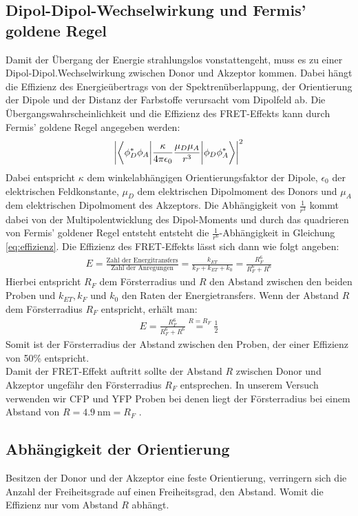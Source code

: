 \subsection*{Dipol-Dipol-Wechselwirkung und Fermis' goldene Regel}
Damit der Übergang der Energie strahlungslos vonstattengeht, muss es zu einer Dipol-Dipol.Wechselwirkung zwischen Donor und Akzeptor kommen. Dabei hängt die Effizienz des Energieübertrags von der Spektrenüberlappung, der Orientierung der Dipole und der Distanz der Farbstoffe verursacht vom Dipolfeld ab. Die Übergangswahrscheinlichkeit und die Effizienz des FRET-Effekts kann durch Fermis' goldene Regel angegeben werden:
\begin{gather}
    \abs{\left\langle \phi_{D}^* \phi_A \bigg \vert \frac{\kappa}{4\pi\epsilon_0} \frac{\mu_D\mu_A}{r^3} \bigg \vert \phi_D \phi_A^* \right\rangle }^2
\end{gather}
Dabei entspricht $\kappa$ dem winkelabhängigen Orientierungsfaktor der Dipole, $\epsilon_0$ der elektrischen Feldkonstante, $\mu_D$ dem elektrischen Dipolmoment des Donors und $\mu_A$ dem elektrischen Dipolmoment des Akzeptors. Die Abhängigkeit von $\frac{1}{r^3}$ kommt dabei von der Multipolentwicklung des Dipol-Moments und durch das quadrieren von Fermis' goldener Regel entsteht entsteht die $\frac{1}{r^6}$-Abhängigkeit in Gleichung \ref{eq:effizienz}. Die Effizienz des FRET-Effekts lässt sich dann wie folgt angeben:
\begin{gather}
    E = \frac{\text{Zahl der Energitransfers}}{\text{Zahl der Anregungen}} = \frac{k_{ET}}{k_F + k_{ET} + k_0} = \frac{R_F^6}{R_F^6+R^6}
    \label{eq:effizienz}
\end{gather}
Hierbei entspricht $R_F$ dem Försterradius und $R$ den Abstand zwischen den beiden Proben und $k_{ET}, k_F$ und $k_0$ den Raten der Energietransfers. Wenn der Abstand $R$ dem Försterradius $R_F$ entspricht, erhält man:
\begin{gather}
    E = \frac{R_F^6}{R_F^6+R^6} \overset{R = R_F}{=} \frac{1}{2}
\end{gather} 
Somit ist der Försterradius der Abstand zwischen den Proben, der einer Effizienz von 50\% entspricht.\\
Damit der FRET-Effekt auftritt sollte der Abstand $R$ zwischen Donor und Akzeptor ungefähr den Försterradius $R_F$ entsprechen. In unserem Versuch verwenden wir CFP und YFP Proben bei denen liegt der Försterradius bei einem Abstand von $R = \SI{4.9}{\nano\metre} = R_F$ \citep{Radius}. 
\subsection*{Abhängigkeit der Orientierung}
Besitzen der Donor und der Akzeptor eine feste Orientierung, verringern sich die Anzahl der Freiheitsgrade auf einen Freiheitsgrad, den Abstand. Womit die Effizienz nur vom Abstand $R$ abhängt.
